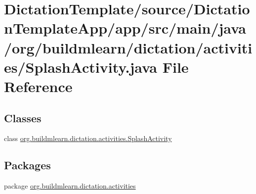 \hypertarget{DictationTemplate_2source_2DictationTemplateApp_2app_2src_2main_2java_2org_2buildmlearn_2dictati6256f36be0882111bfaee12285409029}{}\section{Dictation\+Template/source/\+Dictation\+Template\+App/app/src/main/java/org/buildmlearn/dictation/activities/\+Splash\+Activity.java File Reference}
\label{DictationTemplate_2source_2DictationTemplateApp_2app_2src_2main_2java_2org_2buildmlearn_2dictati6256f36be0882111bfaee12285409029}
\subsection*{Classes}
\begin{DoxyCompactItemize}
\item 
class \hyperlink{classorg_1_1buildmlearn_1_1dictation_1_1activities_1_1SplashActivity}{org.\+buildmlearn.\+dictation.\+activities.\+Splash\+Activity}
\end{DoxyCompactItemize}
\subsection*{Packages}
\begin{DoxyCompactItemize}
\item 
package \hyperlink{namespaceorg_1_1buildmlearn_1_1dictation_1_1activities}{org.\+buildmlearn.\+dictation.\+activities}
\end{DoxyCompactItemize}
